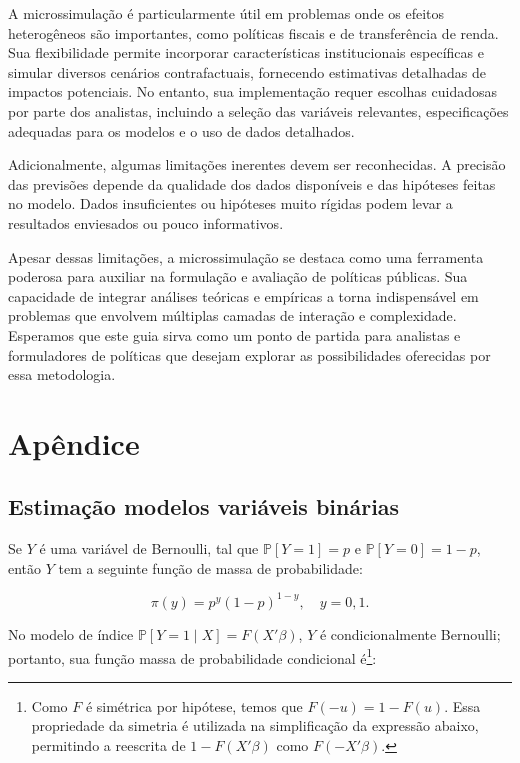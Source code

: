 \documentclass[12pt, a4paper, openany]{book}
\numberwithin{equation}{chapter}
\numberwithin{table}{chapter}
\numberwithin{figure}{chapter}
\theoremstyle{break}
\begin{document}
A microssimulação é particularmente útil em problemas onde os efeitos heterogêneos são importantes, como políticas fiscais e de transferência de renda. Sua flexibilidade permite incorporar características institucionais específicas e simular diversos cenários contrafactuais, fornecendo estimativas detalhadas de impactos potenciais. No entanto, sua implementação requer escolhas cuidadosas por parte dos analistas, incluindo a seleção das variáveis relevantes, especificações adequadas para os modelos e o uso de dados detalhados.

Adicionalmente, algumas limitações inerentes devem ser reconhecidas. A precisão das previsões depende da qualidade dos dados disponíveis e das hipóteses feitas no modelo. Dados insuficientes ou hipóteses muito rígidas podem levar a resultados enviesados ou pouco informativos. 

Apesar dessas limitações, a microssimulação se destaca como uma ferramenta poderosa para auxiliar na formulação e avaliação de políticas públicas. Sua capacidade de integrar análises teóricas e empíricas a torna indispensável em problemas que envolvem múltiplas camadas de interação e complexidade. Esperamos que este guia sirva como um ponto de partida para analistas e formuladores de políticas que desejam explorar as possibilidades oferecidas por essa metodologia.






\chapter{Apêndice}


\section{Estimação modelos variáveis binárias}

 Se \( Y \) é uma variável de Bernoulli, tal que \( \mathbb{P}[Y = 1] = p \) e \( \mathbb{P}[Y = 0] = 1 - p \), então \( Y \) tem a seguinte função de massa de probabilidade:

\[
\pi(y) = p^y (1 - p)^{1 - y}, \quad y = 0, 1.
\]

No modelo de índice \( \mathbb{P}[Y = 1 \mid {X}] = F({X}'{\beta}) \), \( Y \) é condicionalmente Bernoulli; portanto, sua função massa de probabilidade condicional é\footnote{Como \( F \) é simétrica por hipótese, temos que \( F(-u) = 1 - F(u) \). Essa propriedade da simetria é utilizada na simplificação da expressão abaixo, permitindo a reescrita de \( 1 - F({X}'{\beta}) \) como \( F(-{X}'{\beta}) \).}:
\end{document}
